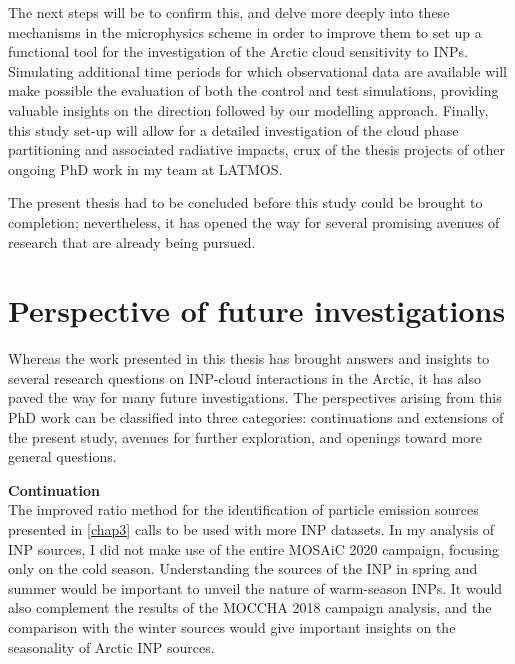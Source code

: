 The next steps will be to confirm this, and delve more deeply into these mechanisms in the microphysics scheme in order to improve them to set up a functional tool for the investigation of the Arctic cloud sensitivity to INPs.
Simulating additional time periods for which observational data are available will make possible the evaluation of both the control and test simulations, providing valuable insights on the direction followed by our modelling approach.
Finally, this study set-up will allow for a detailed investigation of the cloud phase partitioning and associated radiative impacts, crux of the thesis projects of other ongoing PhD work in my team at LATMOS. 

\vspace{\baselineskip}
The present thesis had to be concluded before this study could be brought to completion; nevertheless, it has opened the way for several promising avenues of research that are already being pursued.

\section{Perspective of future investigations}
Whereas the work presented in this thesis has brought answers and insights to several research questions on INP-cloud interactions in the Arctic, it has also paved the way for many future investigations.
The perspectives arising from this PhD work can be classified into three categories: continuations and extensions of the present study, avenues for further exploration, and openings toward more general questions.
\vspace{2cm}

\textbf{Continuation}\\
The improved ratio method for the identification of particle emission sources presented in \cref{chap3} calls to be used with more INP datasets.
In my analysis of INP sources, I did not make use of the entire MOSAiC 2020 campaign, focusing only on the cold season. 
Understanding the sources of the INP in spring and summer would be important to unveil the nature of warm-season INPs. 
It would also complement the results of the MOCCHA 2018 campaign analysis, and the comparison with the winter sources would give important insights on the seasonality of Arctic INP sources.

